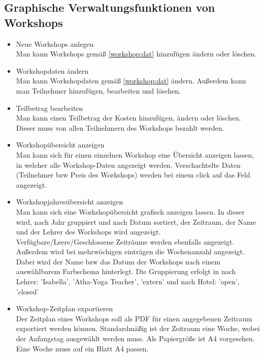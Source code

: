 \subsection{Graphische Verwaltungsfunktionen von Workshops}

\begin{itemize}[leftmargin=1.0in]
    \item [\lf] Neue Workshops anlegen\\
        Man kann Workshops gemäß \ref{workshop:dat} hinzufügen ändern oder löschen.
    \item [\lf] Workshopdaten ändern\\
        Man kann Workshopdaten gemäß \ref{workshop:dat} ändern. Außerdem kann man Teilnehmer hinzufügen, bearbeiten und löschen. 
    \item [\lf] Teilbetrag bearbeiten\\
        Man kann einen Teilbetrag der Kosten hinzufügen, ändern oder löschen. Dieser muss von allen Teilnehmern des Workshops bezahlt werden. 
    \item [\lf] Workshopübersicht anzeigen\\
        Man kann sich für einen einzelnen Workshop eine Übersicht anzeigen lassen, in welcher alle Workshop-Daten angezeigt werden. Verschachtelte Daten (Teilnehmer bzw Preis des Workshops) werden bei einem click auf das Feld angezeigt.
    \item [\lf] Workshopjahresübersicht anzeigen\\
        Man kann sich eine Workshopübersicht grafisch anzeigen lassen. In dieser wird, nach Jahr gruppiert und nach Datum sortiert, der Zeitraum, der Name und der Lehrer des Workshops wird angezeigt. Verfügbare/Leere/Geschlossene Zeiträume werden ebenfalls angezeigt. Außerdem wird bei mehrwöchigen einträgen die Wochenanzahl angezeigt. Dabei wird der Name bzw das Datum der Workshops nach einem auswählbarem Farbschema hinterlegt. Die Gruppierung erfolgt in nach Lehrer: 'Isabella', 'Atha-Yoga Teacher', 'extern' und nach Hotel: 'open', 'closed'
    \item [\lf] Workshop-Zeitplan exportieren\\
        Der Zeitplan eines Workshops soll als PDF für einen angegebenen Zeitraum exportiert werden können. Standardmäßig ist der Zeitraum eine Woche, wobei der Anfangstag ausgewählt werden muss. Als Papiergröße ist A4 vorgesehen. Eine Woche muss auf ein Blatt A4 passen.

\end{itemize}
